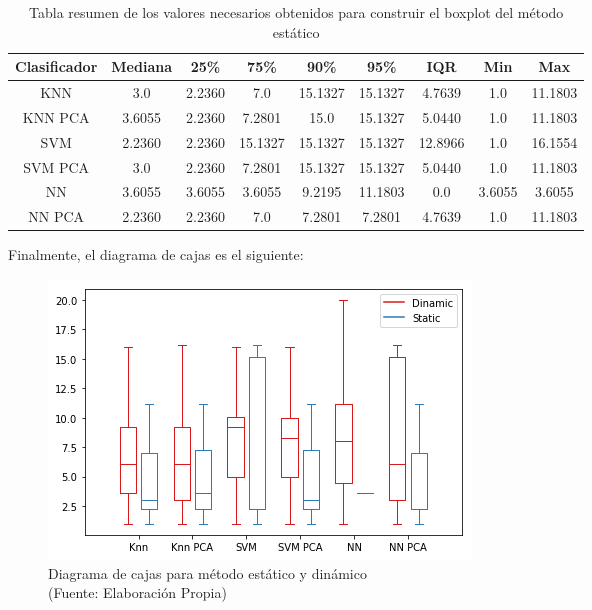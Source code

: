 \begin{table}[!h]
\centering
\caption{Tabla resumen de los valores necesarios obtenidos para construir el boxplot del método estático}
\label{tabla-boxplot-estatico}
\begin{tabular}{|c|c|c|c|c|c|c|c|c|}
\hline
\textbf{Clasificador} & \textbf{Mediana} & \textbf{25\%} & \textbf{75\%} & \textbf{90\%} & \textbf{95\%} & \textbf{IQR} & \textbf{Min} & \textbf{Max} \\ \hline
KNN                   & 3.0              & 2.2360        & 7.0           & 15.1327       & 15.1327       & 4.7639       & 1.0          & 11.1803      \\ \hline
KNN PCA               & 3.6055           & 2.2360        & 7.2801        & 15.0          & 15.1327       & 5.0440       & 1.0          & 11.1803      \\ \hline
SVM                   & 2.2360           & 2.2360        & 15.1327       & 15.1327       & 15.1327       & 12.8966      & 1.0          & 16.1554      \\ \hline
SVM PCA               & 3.0              & 2.2360        & 7.2801        & 15.1327       & 15.1327       & 5.0440       & 1.0          & 11.1803      \\ \hline
NN                    & 3.6055           & 3.6055        & 3.6055        & 9.2195        & 11.1803       & 0.0          & 3.6055       & 3.6055       \\ \hline
NN PCA                & 2.2360           & 2.2360        & 7.0           & 7.2801        & 7.2801        & 4.7639       & 1.0          & 11.1803      \\ \hline
\end{tabular}
\end{table}

Finalmente, el diagrama de cajas es el siguiente:

\begin{figure}[ht!]
\centering
\includegraphics[width=.6\textwidth]{figures/boxplot.png}
\caption[abs]{Diagrama de cajas para método estático y dinámico \\
{\scriptsize (Fuente: Elaboración Propia)}}
\label{fig:online_results}
\end{figure}

